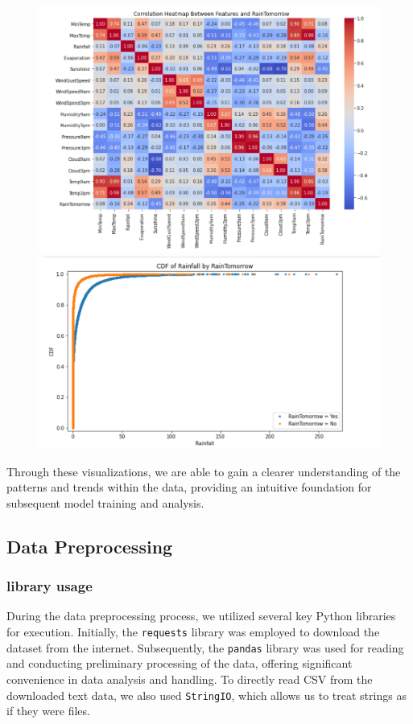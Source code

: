 \documentclass[12pt]{article}
\begin{document}
\begin{figure}[htbp]
  \centering
  \begin{minipage}[b]{0.49\textwidth}
    \includegraphics[width=\textwidth]{3.png}
  \end{minipage}
  \hfill
  \begin{minipage}[b]{0.49\textwidth}
    \includegraphics[width=\textwidth]{4.png}
  \end{minipage}
\end{figure}

Through these visualizations, we are able to gain a clearer understanding of the patterns and trends within the data, providing an intuitive foundation for subsequent model training and analysis.
\subsection{Data Preprocessing}
\subsubsection*{library usage}
During the data preprocessing process, we utilized several key Python libraries for execution. Initially, the \texttt{requests} library was employed to download the dataset from the internet. Subsequently, the \texttt{pandas} library was used for reading and conducting preliminary processing of the data, offering significant convenience in data analysis and handling. To directly read CSV from the downloaded text data, we also used \texttt{StringIO}, which allows us to treat strings as if they were files.
\end{document}

